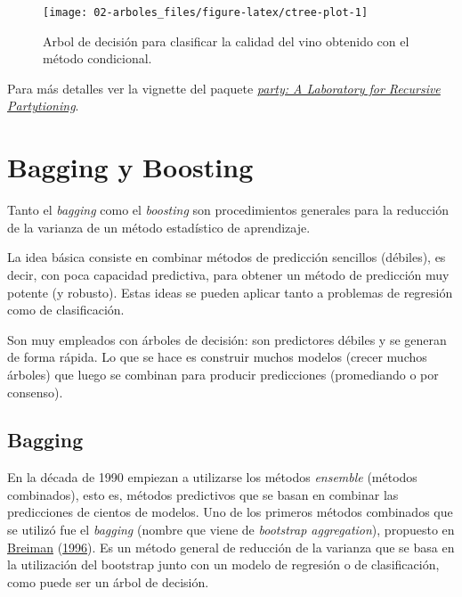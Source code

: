 \documentclass[
  spanish,
]{book}
\theoremstyle{break}
\theoremstyle{definition}
\theoremstyle{definition}
\theoremstyle{definition}
\theoremstyle{definition}
\theoremstyle{remark}
\begin{document}
\begin{figure}[!htb]

{\centering \texttt{[image: 02-arboles\_files/figure-latex/ctree-plot-1]} 

}

\caption{Arbol de decisión para clasificar la calidad del vino obtenido con el método condicional.}\label{fig:ctree-plot}
\end{figure}

Para más detalles ver la vignette del paquete \href{https://cran.r-project.org/web/packages/party/vignettes/party.pdf}{\emph{party: A Laboratory for Recursive Partytioning}}.

\hypertarget{bagging-boosting}{%
\chapter{Bagging y Boosting}\label{bagging-boosting}}

Tanto el \emph{bagging} como el \emph{boosting} son procedimientos generales para la reducción de la varianza de un método estadístico de aprendizaje.

La idea básica consiste en combinar métodos de predicción sencillos (débiles), es decir, con poca capacidad predictiva, para obtener un método de predicción muy potente (y robusto).
Estas ideas se pueden aplicar tanto a problemas de regresión como de clasificación.

Son muy empleados con árboles de decisión: son predictores débiles y se generan de forma rápida.
Lo que se hace es construir muchos modelos (crecer muchos árboles) que luego se combinan para producir predicciones (promediando o por consenso).

\hypertarget{bagging}{%
\section{Bagging}\label{bagging}}

En la década de 1990 empiezan a utilizarse los métodos \emph{ensemble} (métodos combinados), esto es, métodos predictivos que se basan en combinar las predicciones de cientos de modelos.
Uno de los primeros métodos combinados que se utilizó fue el \emph{bagging} (nombre que viene de \emph{bootstrap aggregation}), propuesto en \protect\hyperlink{ref-breiman1996bagging}{Breiman} (\protect\hyperlink{ref-breiman1996bagging}{1996}).
Es un método general de reducción de la varianza que se basa en la utilización del bootstrap junto con un modelo de regresión o de clasificación, como puede ser un árbol de decisión.
\end{document}
